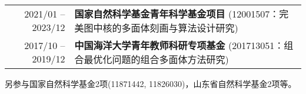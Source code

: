 %
%



 \begin{tabular}{rl}	
	2021/01 -- 2023/12  & \textbf{国家自然科学基金青年科学基金项目} (12001507：完美图中核的多面体刻画与算法设计研究)\\
	2017/10 -- 2019/12 	&  \textbf{中国海洋大学青年教师科研专项基金} (201713051：组合最优化问题的组合多面体方法研究)
\end{tabular}

另参与国家自然科学基金2项(11871442, 11826030)，山东省自然科学基金2项等。